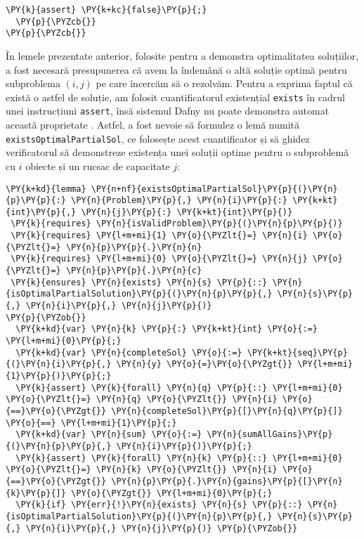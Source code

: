 \begin{sloppypar}
\begin{Verbatim}[commandchars=\\\{\}]
    \PY{k}{assert} \PY{k+kc}{false}\PY{p}{;}
  \PY{p}{\PYZcb{}}
\PY{p}{\PYZcb{}}
\end{Verbatim}
\hspace{4mm}În lemele prezentate anterior, folosite pentru a demonstra optimalitatea soluțiilor, a fost necesară presupunerea că avem la îndemână o altă soluție optimă pentru subproblema $(i, j)$ pe care încercăm să o rezolvăm. Pentru a exprima faptul că există o astfel de soluție, am folosit cuantificatorul existențial \texttt{exists} în cadrul unei instrucțiuni \texttt{assert}, însă sistemul Dafny nu poate demonstra automat această proprietate \cite{FAQ}. Astfel, a fost nevoie să formulez o lemă numită \texttt{existsOptimalPartialSol}, ce folosește acest cuantificator și să ghidez verificatorul să demonstreze existența unei soluții optime pentru o subproblemă cu $i$ obiecte și un rucsac de capacitate $j$:
\begin{Verbatim}[commandchars=\\\{\}]
\PY{k+kd}{lemma} \PY{n+nf}{existsOptimalPartialSol}\PY{p}{(}\PY{n}{p}\PY{p}{:} \PY{n}{Problem}\PY{p}{,} \PY{n}{i}\PY{p}{:} \PY{k+kt}{int}\PY{p}{,} \PY{n}{j}\PY{p}{:} \PY{k+kt}{int}\PY{p}{)} 
 \PY{k}{requires} \PY{n}{isValidProblem}\PY{p}{(}\PY{n}{p}\PY{p}{)}
 \PY{k}{requires} \PY{l+m+mi}{1} \PY{o}{\PYZlt{}=} \PY{n}{i} \PY{o}{\PYZlt{}=} \PY{n}{p}\PY{p}{.}\PY{n}{n}
 \PY{k}{requires} \PY{l+m+mi}{0} \PY{o}{\PYZlt{}=} \PY{n}{j} \PY{o}{\PYZlt{}=} \PY{n}{p}\PY{p}{.}\PY{n}{c}
 \PY{k}{ensures} \PY{n}{exists} \PY{n}{s} \PY{p}{::} \PY{n}{isOptimalPartialSolution}\PY{p}{(}\PY{n}{p}\PY{p}{,} \PY{n}{s}\PY{p}{,} \PY{n}{i}\PY{p}{,} \PY{n}{j}\PY{p}{)}
\PY{p}{\PYZob{}}
  \PY{k+kd}{var} \PY{n}{k} \PY{p}{:} \PY{k+kt}{int} \PY{o}{:=} \PY{l+m+mi}{0}\PY{p}{;}
  \PY{k+kd}{var} \PY{n}{completeSol} \PY{o}{:=} \PY{k+kt}{seq}\PY{p}{(}\PY{n}{i}\PY{p}{,} \PY{n}{y} \PY{o}{=}\PY{o}{\PYZgt{}} \PY{l+m+mi}{1}\PY{p}{)}\PY{p}{;}
  \PY{k}{assert} \PY{k}{forall} \PY{n}{q} \PY{p}{::} \PY{l+m+mi}{0} \PY{o}{\PYZlt{}=} \PY{n}{q} \PY{o}{\PYZlt{}} \PY{n}{i} \PY{o}{==}\PY{o}{\PYZgt{}} \PY{n}{completeSol}\PY{p}{[}\PY{n}{q}\PY{p}{]} \PY{o}{==} \PY{l+m+mi}{1}\PY{p}{;}
  \PY{k+kd}{var} \PY{n}{sum} \PY{o}{:=} \PY{n}{sumAllGains}\PY{p}{(}\PY{n}{p}\PY{p}{,} \PY{n}{i}\PY{p}{)}\PY{p}{;}
  \PY{k}{assert} \PY{k}{forall} \PY{n}{k} \PY{p}{::} \PY{l+m+mi}{0} \PY{o}{\PYZlt{}=} \PY{n}{k} \PY{o}{\PYZlt{}} \PY{n}{i} \PY{o}{==}\PY{o}{\PYZgt{}} \PY{n}{p}\PY{p}{.}\PY{n}{gains}\PY{p}{[}\PY{n}{k}\PY{p}{]} \PY{o}{\PYZgt{}} \PY{l+m+mi}{0}\PY{p}{;}
  \PY{k}{if} \PY{err}{!}\PY{n}{exists} \PY{n}{s} \PY{p}{::} \PY{n}{isOptimalPartialSolution}\PY{p}{(}\PY{n}{p}\PY{p}{,} \PY{n}{s}\PY{p}{,} \PY{n}{i}\PY{p}{,} \PY{n}{j}\PY{p}{)} \PY{p}{\PYZob{}}

\end{Verbatim}
\end{sloppypar}
